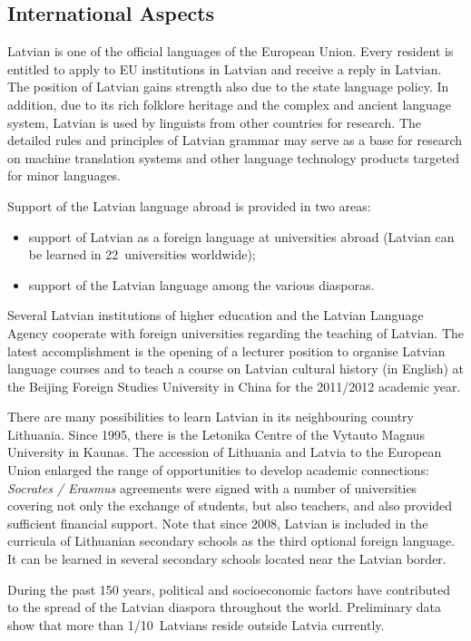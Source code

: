 \begin{multicols}{2}
\subsection{International Aspects}

 Latvian is one of the official languages of the European Union.
Every resident is entitled to apply to EU institutions in Latvian and receive a reply in Latvian.
The position of Latvian gains strength also due to the state language policy.
In addition, due to its rich folklore heritage and the complex and ancient language system, Latvian is used by linguists from other countries for research.
The detailed rules and principles of Latvian grammar may serve as a base for research on machine translation systems and other language technology products targeted for minor languages.

Support of the Latvian language abroad is provided in two areas:

\begin{itemize}
\item  support of Latvian as a foreign language at universities abroad (Latvian can be learned in 22~universities worldwide);
\item  support of the Latvian language among the various diasporas.
\end{itemize}

Several Latvian institutions of higher education and the Latvian Language Agency cooperate with foreign universities regarding the teaching of Latvian.
The latest accomplishment is the opening of a lecturer position to organise Latvian language courses and to teach a course on Latvian cultural history (in English) at the Beijing Foreign Studies University in China for the 2011/2012 academic year.

There are many possibilities to learn Latvian in its neighbouring country Lithuania.
Since 1995, there is the Letonika Centre of the Vytauto Magnus University in Kaunas.
The accession of Lithuania and Latvia to the European Union enlarged the range of opportunities to develop academic connections: \textit{Socrates / Erasmus} agreements were signed with a number of universities covering not only the exchange of students, but also teachers, and also provided sufficient financial support.
Note that since 2008, Latvian is included in the curricula of Lithuanian secondary schools as the third optional foreign language.
It can be learned in several secondary schools located near the Latvian border.

During the past 150 years, political and socioeconomic factors have contributed to the spread of the Latvian diaspora throughout the world.
Preliminary data show that more than 1/10~Latvians reside outside Latvia currently.


\end{multicols}
